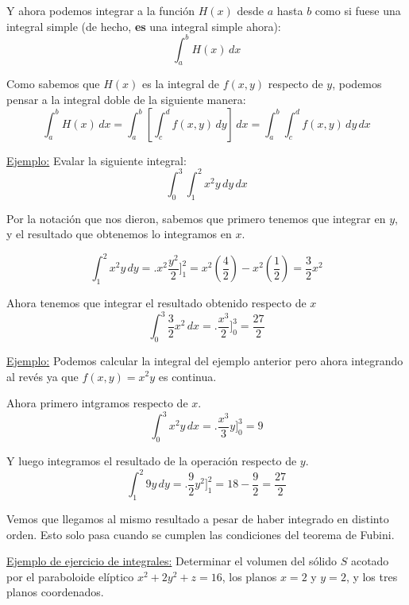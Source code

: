 \documentclass[12pt]{article}
\begin{document}
Y ahora podemos integrar a la función $ H(x) $ desde $ a $ hasta $ b $ como si fuese una integral simple (de hecho, \textbf{es} una integral simple ahora):
\[
  \int_{a}^{b} H(x) \,dx
\]

Como sabemos que $ H(x) $ es la integral de $ f(x,y) $ respecto de $ y $, podemos pensar a la integral doble de la siguiente manera:
\[
  \int_{a}^{b} H(x) \,dx = \int_{a}^{b} \left[\int_{c}^{d} f(x,y) \,dy\right] \,dx = \int_{a}^{b} \int_{c}^{d} f(x,y) \,dy\,dx
\]

\underline{Ejemplo:} Evalar la siguiente integral:
\[
  \int_{0}^{3} \int_{1}^{2} x^2y \,dy\,dx
\]

Por la notación que nos dieron, sabemos que primero tenemos que integrar en $ y $, y el resultado que obtenemos lo integramos en $ x $.

\[
  \int_{1}^{2} x^2y \,dy = \Bigg.x^2\frac{y^2}{2}\Bigg]_{1}^{2} = x^2\left(\frac{4}{2}\right) - x^2\left(\frac{1}{2}\right) = \frac{3}{2}x^2
\]

Ahora tenemos que integrar el resultado obtenido respecto de $ x $
\[
  \int_{0}^{3} \frac{3}{2}x^2 \,dx = \Bigg.\frac{x^3}{2}\Bigg]_{0}^{3}=\frac{27}{2}
\]

\vspace{0.2cm}
\vspace{0.2cm}

\underline{Ejemplo:} Podemos calcular la integral del ejemplo anterior pero ahora integrando al revés ya que $ f(x,y)=x^2y $ es continua.

Ahora primero intgramos respecto de $ x $.
\[
  \int_{0}^{3} x^2y \,dx = \Bigg.\frac{x^3}{3}y\Bigg]_{0}^{3} = 9
\]

Y luego integramos el resultado de la operación respecto de $ y $.
\[
  \int_{1}^{2} 9y \,dy = \Bigg.\frac{9}{2}y^2\Bigg]_{1}^{2} = 18 - \frac{9}{2} = \frac{27}{2}
\]

Vemos que llegamos al mismo resultado a pesar de haber integrado en distinto orden. Esto solo pasa cuando se cumplen las condiciones del teorema de Fubini.

\underline{Ejemplo de ejercicio de integrales:} Determinar el volumen del sólido $ S $ acotado por el paraboloide elíptico $ x^2+2y^2+z=16 $, los planos $ x=2 $ y $ y=2 $, y los tres planos coordenados.
\end{document}
